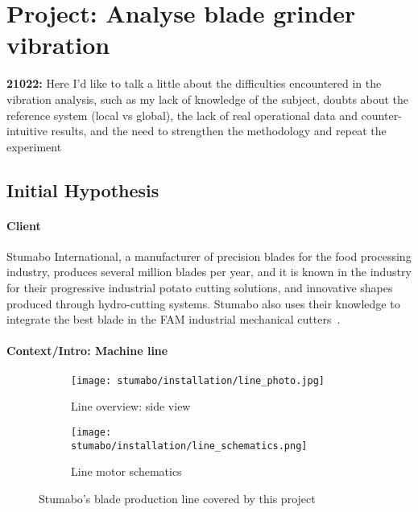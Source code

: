 \section{Project: Analyse blade grinder vibration}

\textbf{21022:} Here I'd like to talk a little about the difficulties encountered in the vibration analysis, such as my lack of knowledge of the subject, doubts about the reference system (local vs global),
the lack of real operational data and counter-intuitive results, and the need to strengthen the methodology and repeat the experiment


\subsection{Initial Hypothesis}
\paragraph{Client} Stumabo International, a manufacturer of precision blades for the food processing industry, produces several million blades per year, 
and it is known in the industry for their progressive industrial potato cutting solutions, and innovative shapes produced through hydro-cutting systems.
Stumabo also uses their knowledge to integrate the best blade in the FAM industrial mechanical cutters~\cite{Misc:stumabo_en_website}.

\paragraph{Context/Intro: Machine line}
\begin{figure}[ht]
    \begin{subfigure}{\textwidth}
        \texttt{[image: stumabo/installation/line\_photo.jpg]}
        \caption{Line overview: side view}
        \label{fig:line_overview}
    \end{subfigure}
    \begin{subfigure}{\textwidth}
        \texttt{[image: stumabo/installation/line\_schematics.png]}
        \caption{Line motor schematics}
        \label{fig:line_schematics}
    \end{subfigure}
    \caption{Stumabo's blade production line covered by this project}
    \label{fig:stumabo_prod_line}
\end{figure}

